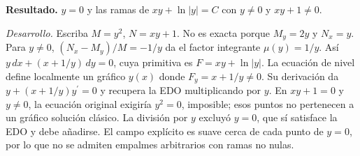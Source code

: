 \noindent\textbf{Resultado.} $y=0$ y las ramas de $xy+\ln|y|=C$ con $y\ne0$ y $xy+1\ne0$.

\noindent\textit{Desarrollo.} Escriba $M=y^2$, $N=xy+1$. No es exacta porque $M_y=2y$ y $N_x=y$. Para $y\ne0$, $(N_x-M_y)/M=-1/y$ da el factor integrante $\mu(y)=1/y$. Así $y\,dx+(x+1/y)\,dy=0$, cuya primitiva es $F=xy+\ln|y|$. La ecuación de nivel define localmente un gráfico $y(x)$ donde $F_y=x+1/y\ne0$. Su derivación da $y+(x+1/y)y^{\prime}=0$ y recupera la EDO multiplicando por $y$. En $xy+1=0$ y $y\ne0$, la ecuación original exigiría $y^2=0$, imposible; esos puntos no pertenecen a un gráfico solución clásico. La división por $y$ excluyó $y=0$, que sí satisface la EDO y debe añadirse. El campo explícito es suave cerca de cada punto de $y=0$, por lo que no se admiten empalmes arbitrarios con ramas no nulas.
